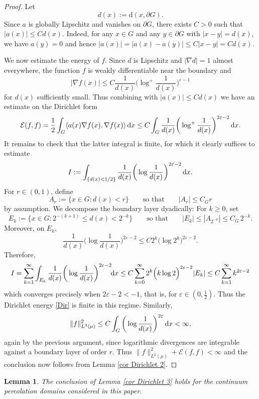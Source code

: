 \documentclass[11pt]{article}
\renewcommand{\d}{{\rm d}}
\newcommand{\eps}{\varepsilon}
\newtheorem{lemma}[theorem]{Lemma}
\theoremstyle{rem}
\begin{document}
\begin{proof}
Let
\[
d(x):=\mathrm d(x,\partial G).
\]
Since $a$ is globally Lipschitz and vanishes on $\partial G$, there exists $C>0$ such that
$|a(x)|\leq C d(x)$. Indeed, for any $x\in G$ and any $y\in\partial G$ with $|x-y|=d(x)$, we have $a(y)=0$ and hence $|a(x)|=|a(x)-a(y)|\leq C|x-y|=C d(x)$.


We now estimate the energy of $f$. Since $d$ is Lipschitz and $|\nabla d|=1$ almost everywhere, the function $f$ is weakly differentiable near the boundary and
\[
|\nabla f(x)|
\leq
C
\frac{1}{d(x)}
\bigg(\log^+\frac1{d(x)}\bigg)^{\eps-1}
\]
for $d(x)$ sufficiently small. Thus combining with $|a(x)|\leq C d(x)$  we have an estimate on the Dirichlet form
\begin{equation}\label{Dir}
\mathcal E(f,f)
=\frac12\int_G\langle a(x)\nabla f(x),\nabla f(x)\rangle\,\d x \leq
C
\int_G
\frac1{d(x)}
\bigg(\log^+\frac1{d(x)}\bigg)^{2\eps-2}
\,\d x.
\end{equation}
It remains to check that the latter integral is finite, for which it clearly suffices to estimate
\[
I := \int_{\{d(x)<1/2\}} \frac1{d(x)}
\bigg(\log\frac1{d(x)}\bigg)^{2\eps-2}
\,\d x.
\]
For $r\in(0,1)$, define
\[
A_r
:=
\{x\in G:d(x)<r\} \qquad\mbox{so that}\qquad |A_r|
\leq
C_G r
\]
by assumption. We decompose the boundary layer dyadically: For $k\geq0$, set
\[
E_k
:=
\big\{ x\in G : 
2^{-(k+1)} \leq d(x) < 2^{-k} \big\} 
\qquad\mbox{so that} \qquad |E_k|
\leq 
|A_{2^{-k} }|
\leq
C_G\,2^{-k}.
\]
Moreover, on $E_k$,
\[
\frac1{d(x)}
\bigg(\log\frac1{d(x)}\bigg)^{2\eps-2}
\leq
C 2^k 
\bigg( \log {2^k} \bigg)^{2\eps-2}.
\]
Therefore,
\[
I =
\sum_{k=1}^\infty
\int_{E_k} \frac1{d(x)}
\bigg(\log\frac1{d(x)}\bigg)^{2\eps-2}  \!\d x
\leq
C
\sum_{k=0}^\infty
2^k 
\Big( k\log 2\Big)^{2\eps-2}
|E_k|
\leq C \sum_{k=1}^\infty k^{2\eps-2}
\]
which converges precisely when
$2\eps-2<-1$, that is, for 
$\eps\in(0,\tfrac12)$. Thus the Dirichlet energy \eqref{Dir} is finite in this regime. 
Similarly,
\[
\|f\|_{L^2(\mu)}^2
\leq
C\int_G
\bigg(\log\frac1{d(x)}\bigg)^{2\eps}
\,\d x
<\infty,
\]
again by the previous argument, since logarithmic divergences are integrable against a boundary layer of order $r$. Thus $\|f\|_{L^2(\mu)}^2+\mathcal E(f,f)<\infty$ and 
the conclusion now follows from Lemma \ref{cor Dirichlet 2}.
\end{proof}

\begin{lemma}\label{cor Dirichlet 4}
The conclusion of Lemma \ref{cor Dirichlet 3} holds for the continuum percolation domains considered in this paper.
\end{lemma}
\end{document}
